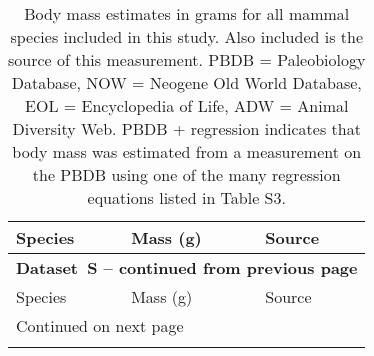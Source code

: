 \documentclass{article}
\renewcommand{\thetable}{S\arabic{table}}
\renewcommand{\tablename}{Dataset}
\begin{document}
\small
\begin{center}
  \begin{longtable}{p{} p{} p{} }
    \caption[Mammal body mass estimates]{Body mass estimates in grams for all mammal species included in this study. Also included is the source of this measurement. PBDB = Paleobiology Database, NOW = Neogene Old World Database, EOL = Encyclopedia of Life, ADW = Animal Diversity Web. PBDB + regression indicates that body mass was estimated from a measurement on the PBDB using one of the many regression equations listed in Table S3.} \label{tab:mass_data} \\

    \hline Species & Mass (g) & Source \\ \hline
    \endfirsthead

    \multicolumn{3}{p{\textwidth}}{{ \bfseries \tablename\ \thetable{} -- continued from previous page}} \\
    \hline Species & Mass (g) & Source \\ \hline
    \endhead

    \hline \multicolumn{3}{p{\textwidth}}{{Continued on next page}} \\ \hline
    \endfoot


\end{longtable}
\end{center}
\end{document}
